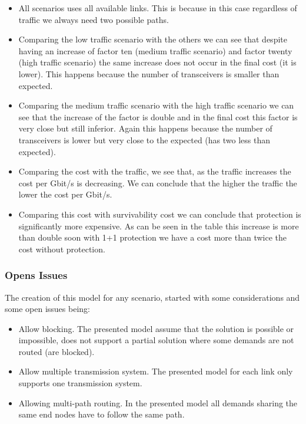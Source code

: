 \begin{itemize}
  \item All scenarios uses all available links. This is because in this case regardless of traffic we always need two possible paths.
  \item Comparing the low traffic scenario with the others we can see that despite having an increase of factor ten (medium traffic scenario) and factor twenty (high traffic scenario) the same increase does not occur in the final cost (it is lower). This happens because the number of transceivers is smaller than expected.
  \item Comparing the medium traffic scenario with the high traffic scenario we can see that the increase of the factor is double and in the final cost this factor is very close but still inferior. Again this happens because the number of transceivers is lower but very close to the expected (has two less than expected).
  \item Comparing the cost with the traffic, we see that, as the traffic increases the cost per Gbit/s is decreasing. We can conclude that the higher the traffic the lower the cost per Gbit/s.
  \item Comparing this cost with survivability cost we can conclude that protection is significantly more expensive. As can be seen in the table this increase is more than double soon with 1+1 protection we have a cost more than twice the cost without protection.
\end{itemize}

\vspace{13pt}
\subsubsection{Opens Issues}

The creation of this model for any scenario, started with some considerations and some open issues being:

\begin{itemize}
  \item Allow blocking.
  \subitem The presented model assume that the solution is possible or impossible, does not support a partial solution where some demands are not routed (are blocked).
  \item Allow multiple transmission system.
  \subitem The presented model for each link only supports one transmission system.
  \item Allowing multi-path routing.
  \subitem In the presented model all demands sharing the same end nodes have to follow the same path.
\end{itemize}

